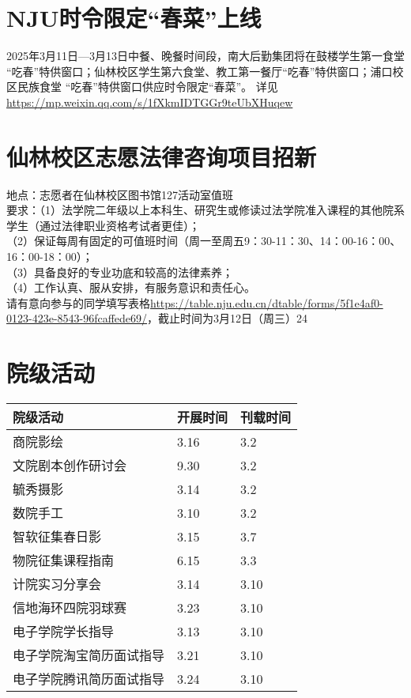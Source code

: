 \documentclass[letterpaper, 12pt]{article}
\begin{document}
\begin{multicols}{2}
\section{NJU时令限定“春菜”上线}
2025年3月11日—3月13日中餐、晚餐时间段，南大后勤集团将在鼓楼学生第一食堂 “吃春”特供窗口；仙林校区学生第六食堂、教工第一餐厅“吃春”特供窗口；浦口校区民族食堂 “吃春”特供窗口供应时令限定“春菜”。
详见\url{https://mp.weixin.qq.com/s/1fXkmIDTGGr9teUbXHuqew}
\section{仙林校区志愿法律咨询项目招新}
地点：志愿者在仙林校区图书馆127活动室值班\\
要求：（1）法学院二年级以上本科生、研究生或修读过法学院准入课程的其他院系学生（通过法律职业资格考试者更佳）；\\
（2）保证每周有固定的可值班时间（周一至周五9：30-11：30、14：00-16：00、16：00-18：00）；\\
（3）具备良好的专业功底和较高的法律素养；\\
（4）工作认真、服从安排，有服务意识和责任心。\\
请有意向参与的同学填写表格\url{https://table.nju.edu.cn/dtable/forms/5f1e4af0-0123-423e-8543-96fcaffede69/}，截止时间为3月12日（周三）24\\
\section{院级活动}
\begin{tabular}{|>{\centering\arraybackslash}m{}|m{}|m{}|}
    \hline
    院级活动 & 开展时间 & 刊载时间\\
    \hline\hline
    商院影绘 & 3.16 & 3.2\\
    文院剧本创作研讨会 & 9.30 & 3.2\\
    毓秀摄影 & 3.14 & 3.2\\
    数院手工 & 3.10 & 3.2\\
    智软征集春日影 & 3.15 & 3.7\\
    物院征集课程指南 & 6.15 & 3.3\\
    计院实习分享会 & 3.14 & 3.10\\
    信地海环四院羽球赛 & 3.23 & 3.10\\
    电子学院学长指导 & 3.13 & 3.10\\
    电子学院淘宝简历面试指导 & 3.21 & 3.10\\
    电子学院腾讯简历面试指导 & 3.24 & 3.10\\
    \hline
\end{tabular}

\end{multicols}
\end{document}
